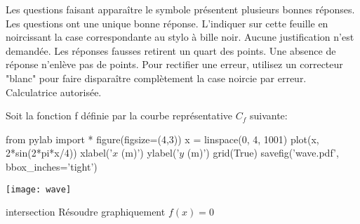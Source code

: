 \documentclass[a4paper]{article}
\def\barQ{b=1,m=-0.25}
\begin{document}
{{\begin{minipage}{0.96\linewidth}
\vspace*{3mm} %
\begin{center}\em  %

Les questions faisant apparaître le symbole \multiSymbole{} présentent  plusieurs bonnes réponses.
Les questions ont une unique bonne réponse. L'indiquer sur cette feuille en noircissant la case correspondante au stylo à bille noir. Aucune justification n'est demandée.
Les réponses fausses retirent un quart des points. Une absence de réponse n'enlève pas de points.
Pour rectifier une erreur, utilisez un correcteur "blanc" pour faire disparaître complètement la case noircie par erreur.	Calculatrice autorisée.
 

\end{center}

	\end{minipage}\hspace*{\fill}
	
	
\vspace{5ex}








Soit la fonction f définie par la courbe représentative $C_{f}$ suivante:


\begin{pycode}
from pylab import *
figure(figsize=(4,3))
x = linspace(0, 4, 1001)
plot(x, 2*sin(2*pi*x/4))
xlabel('$x$ (m)')
ylabel('$y$ (m)')
grid(True)
savefig('wave.pdf', bbox_inches='tight')
\end{pycode}

\texttt{[image: wave]}

\begin{question}{intersection}\bareme{\barQ}
Résoudre graphiquement $f(x)=0$
			\begin{reponseshoriz}
				\mauvaise{$$}
				\mauvaise{$$} 				
 				\mauvaise{$$}
				\bonne{$$}
			\end{reponseshoriz}
\end{question}



}
}
\end{document}
